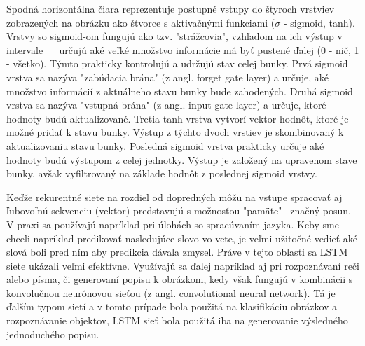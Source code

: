 Spodná horizontálna čiara reprezentuje postupné vstupy do štyroch vrstviev zobrazených na obrázku ako štvorce s aktivačnými funkciami ($\sigma$ - sigmoid, tanh). Vrstvy so sigmoid-om fungujú ako tzv. "strážcovia", vzhľadom na ich výstup v intervale \ <0,1> \ určujú aké veľké množstvo informácie má byť pustené ďalej (0 - nič, 1 - všetko). Týmto prakticky kontrolujú a udržujú stav celej bunky. Prvá sigmoid vrstva sa nazýva "zabúdacia brána" (z angl. forget gate layer) a určuje, aké množstvo informácií z aktuálneho stavu bunky bude zahodených. Druhá sigmoid vrstva sa nazýva "vstupná brána" (z angl. input gate layer) a určuje, ktoré hodnoty budú aktualizované. Tretia tanh vrstva vytvorí vektor hodnôt, ktoré je možné pridať k stavu bunky. Výstup z týchto dvoch vrstiev je skombinovaný k aktualizovaniu stavu bunky. Posledná sigmoid vrstva prakticky určuje aké hodnoty budú výstupom z celej jednotky. Výstup je založený na upravenom stave bunky, avšak vyfiltrovaný na základe hodnôt z poslednej sigmoid vrstvy.

Keďže rekurentné siete na rozdiel od dopredných môžu na vstupe spracovať aj ľubovoľnú sekvenciu (vektor) predstavujú s možnosťou "pamäte" \ značný posun. V praxi sa používajú napríklad pri úlohách so spracúvaním jazyka. Keby sme chceli napríklad predikovať nasledujúce slovo vo vete, je veľmi užitočné vedieť aké slová boli pred ním aby predikcia dávala zmysel. Práve v tejto oblasti sa LSTM siete ukázali veľmi efektívne. Využívajú sa ďalej napríklad aj pri rozpoznávaní reči\cite{rnn_speech} alebo písma\cite{rnn_handwriting}, či generovaní popisu k obrázkom\cite{image_description}, kedy však fungujú v kombinácii s konvolučnou neurónovou sieťou (z angl. convolutional neural network). Tá je ďalším typom sietí a v tomto prípade bola použitá na klasifikáciu obrázkov a rozpoznávanie objektov, LSTM sieť bola použitá iba na generovanie výsledného jednoduchého popisu.


